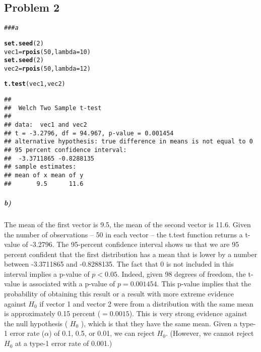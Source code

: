 \documentclass[12pt,letter]{article}\usepackage[]{graphicx}\usepackage[]{color}
\makeatletter
\newcommand{\hlnum}[1]{\textcolor[rgb]{0.686,0.059,0.569}{#1}}%
\newcommand{\hlcom}[1]{\textcolor[rgb]{0.678,0.584,0.686}{\textit{#1}}}%
\newcommand{\hlstd}[1]{\textcolor[rgb]{0.345,0.345,0.345}{#1}}%
\newcommand{\hlkwb}[1]{\textcolor[rgb]{0.69,0.353,0.396}{#1}}%
\newcommand{\hlkwc}[1]{\textcolor[rgb]{0.333,0.667,0.333}{#1}}%
\newcommand{\hlkwd}[1]{\textcolor[rgb]{0.737,0.353,0.396}{\textbf{#1}}}%
\newenvironment{kframe}{%
 \def\at@end@of@kframe{}%
 \ifinner\ifhmode%
  \def\at@end@of@kframe{\end{minipage}}%
  \begin{minipage}{\columnwidth}%
 \fi\fi%
 \def\FrameCommand##1{\hskip\@totalleftmargin \hskip-\fboxsep
 \colorbox{shadecolor}{##1}\hskip-\fboxsep
     \hskip-\linewidth \hskip-\@totalleftmargin \hskip\columnwidth}%
 \MakeFramed {\advance\hsize-\width
   \@totalleftmargin\z@ \linewidth\hsize
   \@setminipage}}%
 {\par\unskip\endMakeFramed%
 \at@end@of@kframe}
\newenvironment{knitrout}{}{} %
\makeatother
\begin{document}
\subsection*{Problem 2}

\begin{knitrout}
\color{fgcolor}\begin{kframe}
\begin{alltt}
\hlcom{### a}

\hlkwd{set.seed}\hlstd{(}\hlnum{2}\hlstd{)}
\hlstd{vec1} \hlkwb{=} \hlkwd{rpois}\hlstd{(}\hlnum{50}\hlstd{,} \hlkwc{lambda} \hlstd{=} \hlnum{10}\hlstd{)}
\hlkwd{set.seed}\hlstd{(}\hlnum{2}\hlstd{)}
\hlstd{vec2} \hlkwb{=} \hlkwd{rpois}\hlstd{(}\hlnum{50}\hlstd{,} \hlkwc{lambda} \hlstd{=} \hlnum{12}\hlstd{)}

\hlkwd{t.test}\hlstd{(vec1, vec2)}
\end{alltt}
\begin{verbatim}
## 
## 	Welch Two Sample t-test
## 
## data:  vec1 and vec2
## t = -3.2796, df = 94.967, p-value = 0.001454
## alternative hypothesis: true difference in means is not equal to 0
## 95 percent confidence interval:
##  -3.3711865 -0.8288135
## sample estimates:
## mean of x mean of y 
##       9.5      11.6
\end{verbatim}
\end{kframe}
\end{knitrout}

\subparagraph{b)} The mean of the first vector is 9.5, the mean of the second vector is 11.6. Given the number of observations -- 50 in each vector -- the t.test function returns a t-value of -3.2796. The 95-percent confidence interval shows us that we are 95 percent confident that the first distribution has a mean that is lower by a number between -3.3711865 and -0.8288135. The fact that 0 is not included in this interval implies a p-value of $p < 0.05$. Indeed, given 98 degrees of freedom, the t-value is associated with a p-value of $p = 0.001454$. This p-value implies that the probability of obtaining this result or a result with more extreme evidence against $H_0$ if vector 1 and vector 2 were from a distribution with the same mean is approximately 0.15 percent ($= 0.0015$). This is very strong evidence against the null hypothesis ( $H_0$ ), which is that they have the same mean. Given a type-1 error rate ($\alpha$) of 0.1, 0.5, or 0.01, we can reject $H_0$. (However, we cannot reject $H_0$ at a type-1 error rate of 0.001.)
\end{document}

